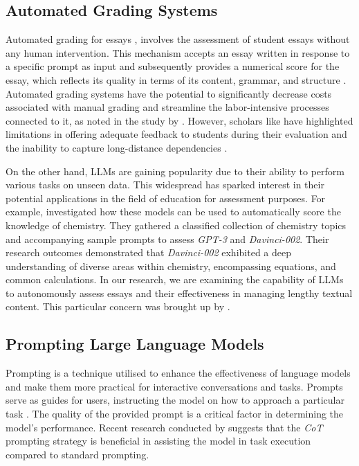 \documentclass{article}
\begin{document}
\subsection{Automated Grading Systems}

Automated grading for essays \cite{taghipour2016neural}, involves the assessment of student essays without any human intervention. This mechanism accepts an essay written in response to a specific prompt as input and subsequently provides a numerical score for the essay, which reflects its quality in terms of its content, grammar, and structure \cite{taghipour2016neural}. Automated grading systems have the potential to significantly decrease costs associated with manual grading and streamline the labor-intensive processes connected to it, as noted in the study by \cite{dong2017attention}. 
However, scholars like \cite{ramesh2022automated} have highlighted limitations in offering adequate feedback to students during their evaluation and the inability to capture long-distance dependencies\cite{dong2017attention} \cite{li2018coherence}.


On the other hand, LLMs are gaining popularity due to their ability to perform various tasks on unseen data. This widespread has sparked interest in their potential applications in the field of education for assessment purposes. For example, \cite{white2023assessment} investigated how these models can be used to automatically score the knowledge of chemistry. They gathered a classified collection of chemistry topics and accompanying sample prompts to assess \textit{{GPT-3}} and \textit{{Davinci-002}}. Their research outcomes demonstrated that \textit{{Davinci-002}} exhibited a deep understanding of diverse areas within chemistry, encompassing equations, and common calculations. In our research, we are examining the capability of LLMs to autonomously assess essays and their effectiveness in managing lengthy textual content. This particular concern was brought up by \cite{li2018coherence}.

\subsection{Prompting Large Language Models}

Prompting is a technique utilised to enhance the effectiveness of language models and make them more practical for interactive conversations and tasks. Prompts serve as guides for users, instructing the model on how to approach a particular task \cite{zhang2022automatic}. The quality of the provided prompt is a critical factor in determining the model's performance. Recent research conducted by \cite{wei2022chain} suggests that the  \textit{CoT} prompting strategy is beneficial in assisting the model in task execution compared to standard prompting.
\end{document}
